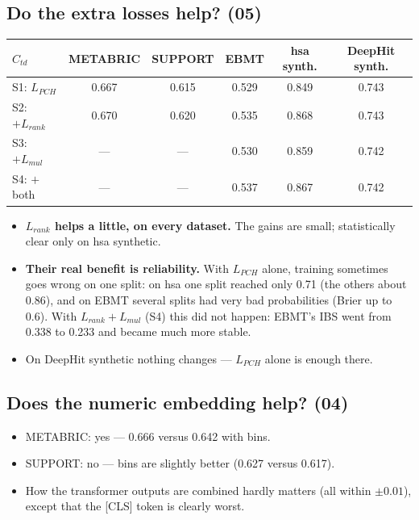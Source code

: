 \documentclass[11pt]{article}
\begin{document}
\subsection{Do the extra losses help? (05)}
\begin{table}[H]
\centering
\begin{tabular}{lccccc}
\toprule
$C_{td}$ & METABRIC & SUPPORT & EBMT & hsa synth. & DeepHit synth. \\
\midrule
S1: $L_{PCH}$ & 0.667 & 0.615 & 0.529 & 0.849 & 0.743 \\
S2: $+L_{rank}$ & 0.670 & 0.620 & 0.535 & 0.868 & 0.743 \\
S3: $+L_{mul}$ & --- & --- & 0.530 & 0.859 & 0.742 \\
S4: $+$both & --- & --- & 0.537 & 0.867 & 0.742 \\
\bottomrule
\end{tabular}
\end{table}
\begin{itemize}
  \item \textbf{$L_{rank}$ helps a little, on every dataset.} The gains are small; statistically clear
        only on hsa synthetic.
  \item \textbf{Their real benefit is reliability.} With $L_{PCH}$ alone, training sometimes goes wrong
        on one split: on hsa one split reached only 0.71 (the others about 0.86), and on EBMT several
        splits had very bad probabilities (Brier up to 0.6). With $L_{rank}+L_{mul}$ (S4) this did not
        happen: EBMT's IBS went from 0.338 to 0.233 and became much more stable.
  \item On DeepHit synthetic nothing changes --- $L_{PCH}$ alone is enough there.
\end{itemize}

\subsection{Does the numeric embedding help? (04)}
\begin{itemize}
  \item METABRIC: yes --- 0.666 versus 0.642 with bins.
  \item SUPPORT: no --- bins are slightly better (0.627 versus 0.617).
  \item How the transformer outputs are combined hardly matters (all within $\pm0.01$), except that
        the [CLS] token is clearly worst.
\end{itemize}
\end{document}
